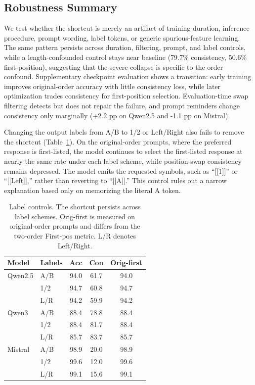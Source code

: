 \documentclass[letterpaper]{article}
\newcommand{\multirow}[3]{#3}
\begin{document}
\subsection{Robustness Summary}

We test whether the shortcut is merely an artifact of training duration, inference procedure, prompt wording, label tokens, or generic spurious-feature learning. The same pattern persists across duration, filtering, prompt, and label controls, while a length-confounded control stays near baseline (79.7\% consistency, 50.6\% first-position), suggesting that the severe collapse is specific to the order confound. Supplementary checkpoint evaluation shows a transition: early training improves original-order accuracy with little consistency loss, while later optimization trades consistency for first-position selection. Evaluation-time swap filtering detects but does not repair the failure, and prompt reminders change consistency only marginally (+2.2 pp on Qwen2.5 and -1.1 pp on Mistral).

Changing the output labels from A/B to 1/2 or Left/Right also fails to remove the shortcut (Table~\ref{tab:labels}). On the original-order prompts, where the preferred response is first-listed, the model continues to select the first-listed response at nearly the same rate under each label scheme, while position-swap consistency remains depressed. The model emits the requested symbols, such as ``[[1]]'' or ``[[Left]],'' rather than reverting to ``[[A]].'' This control rules out a narrow explanation based only on memorizing the literal A token.

\begin{table}[t]
\centering
\scriptsize
\setlength{\tabcolsep}{3pt}
\begin{tabular}{llccc}
\toprule
\textbf{Model} & \textbf{Labels} & \textbf{Acc} & \textbf{Con} & \textbf{Orig-first} \\
\midrule
\multirow{3}{*}{Qwen2.5} & A/B & 94.0 & 61.7 & 94.0 \\
& 1/2 & 94.7 & 60.8 & 94.7 \\
& L/R & 94.2 & 59.9 & 94.2 \\
\midrule
\multirow{3}{*}{Qwen3} & A/B & 88.4 & 78.8 & 88.4 \\
& 1/2 & 88.4 & 81.7 & 88.4 \\
& L/R & 85.7 & 83.7 & 85.7 \\
\midrule
\multirow{3}{*}{Mistral} & A/B & 98.9 & 20.0 & 98.9 \\
& 1/2 & 99.6 & 12.0 & 99.6 \\
& L/R & 99.1 & 15.6 & 99.1 \\
\bottomrule
\end{tabular}
\caption{Label controls. The shortcut persists across label schemes. Orig-first is measured on original-order prompts and differs from the two-order First-pos metric. L/R denotes Left/Right.}
\label{tab:labels}
\end{table}
\end{document}
